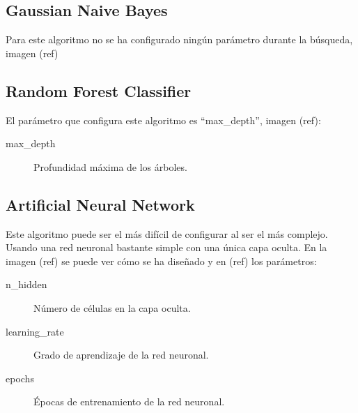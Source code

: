 \subsection{Gaussian Naive Bayes}
Para este algoritmo no se ha configurado ningún parámetro durante la búsqueda, imagen (ref)

\subsection{Random Forest Classifier}
El parámetro que configura este algoritmo es ``max\_depth'', imagen (ref):
\begin{description}
    \item [max\_depth] Profundidad máxima de los árboles.
\end{description}

\subsection{Artificial Neural Network}
Este algoritmo puede ser el más difícil de configurar al ser el más complejo. Usando una red neuronal bastante simple con una única capa oculta. En la imagen (ref) se puede ver cómo se ha diseñado y en (ref) los parámetros:
\begin{description}
 \item [n\_hidden] Número de células en la capa oculta.
 \item [learning\_rate] Grado de aprendizaje de la red neuronal.
 \item [epochs] Épocas de entrenamiento de la red neuronal.
\end{description}

